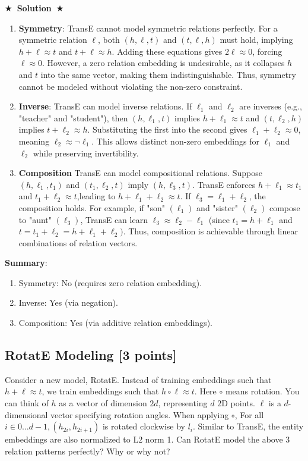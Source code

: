 \documentclass[11pt]{article}
\numberwithin{figure}{section}
\newcommand{\Solution}[1]{{\medskip \color{red} \bf $\bigstar$~\sf \textbf{Solution}~$\bigstar$ \sf #1 } \bigskip}
\begin{document}
\Solution{}
\begin{enumerate}[label=\textbullet]
    \item \textbf{Symmetry}: TransE cannot model symmetric relations perfectly. For a symmetric relation $\ell$, both $\left(h,\ell,t\right)$ and $\left(t,\ell,h\right)$ must hold, implying $h+\ell \approx t$ and $t+\ell \approx h$. Adding these equations gives $2\ell \approx 0$, forcing $\ell \approx 0$. However, a zero relation embedding is undesirable, as it collapses $h$ and $t$ into the same vector, making them indistinguishable. Thus, symmetry cannot be modeled without violating the non-zero constraint.
    \item \textbf{Inverse}: TransE can model inverse relations. If $\ell_{1}$ and $\ell_{2}$ are inverses (e.g., "teacher" and "student"), then $\left(h,\ell_{1},t\right)$ implies $h+\ell_{1} \approx t$ and $\left(t,\ell_{2},h\right)$ implies $t+\ell_{2} \approx h$. Substituting the first into the second gives $\ell_{1} + \ell_{2} \approx 0$, meaning $\ell_{2} \approx \neg\ell_{1}$. This allows distinct non-zero embeddings for $\ell_{1}$ and $\ell_{2}$ while preserving invertibility.
    \item \textbf{Composition} TransE can model compositional relations. Suppose $(h,\ell_{1},t_{1})$ and $(t_{1},\ell_{2},t)$ imply $(h,\ell_{3},t)$. TransE enforces $h+\ell_{1} \approx t_{1}$ and $t_{1}+\ell_{2} \approx t$,leading to $h+\ell_{1}+\ell_{2} \approx t$. If $\ell_{3}=\ell_{1}+\ell_{2}$, the composition holds. For example, if "son" $(\ell_{1})$ and "sister" $(\ell_{2})$ compose to "aunt" $(\ell_{3})$, TransE can learn $\ell_{3} \approx \ell_{2} - \ell_{1}$ (since $t_{1}=h+\ell_{1}$ and $t=t_{1}+\ell_{2}=h+\ell_{1}+\ell_{2})$. Thus, composition is achievable through linear combinations of relation vectors.
\end{enumerate}

\textbf{Summary}:
\begin{enumerate}
    \item Symmetry: No (requires zero relation embedding).
    \item Inverse: Yes (via negation).
    \item Composition: Yes (via additive relation embeddings).
\end{enumerate}

\subsection{RotatE Modeling [3 points]}
Consider a new model, RotatE. Instead of training embeddings such that $h+\ell \approx t$, we train embeddings such that $h \circ \ell \approx t$. Here $\circ$ means rotation. You can think of $h$ as a vector of dimension $2 d$, representing $d$ $2 \mathrm{D}$ points. $\ell$ is a $d$-dimensional vector specifying rotation angles. When applying $\circ$, For all $i \in 0 \ldots d-1, \left(h_{2 i}, h_{2 i+1}\right)$ is rotated clockwise by $l_i$. Similar to TransE, the entity embeddings are also normalized to L2 norm 1. Can RotatE model the above 3 relation patterns perfectly? Why or why not?
\end{document}
